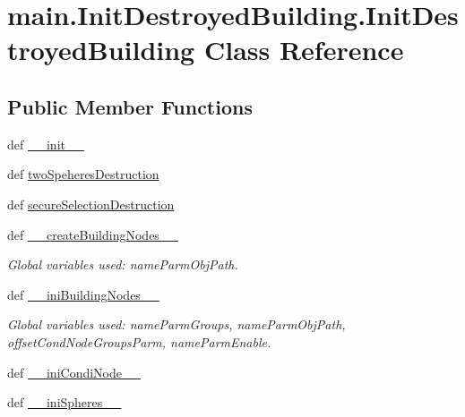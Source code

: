 \hypertarget{classmain_1_1_init_destroyed_building_1_1_init_destroyed_building}{\section{main.\-Init\-Destroyed\-Building.\-Init\-Destroyed\-Building Class Reference}
\label{classmain_1_1_init_destroyed_building_1_1_init_destroyed_building}
}
\subsection*{Public Member Functions}
\begin{DoxyCompactItemize}
\item 
def \hyperlink{classmain_1_1_init_destroyed_building_1_1_init_destroyed_building_a2f4c0cd9f08fdd84a6e25724fa150fb3}{\-\_\-\-\_\-init\-\_\-\-\_\-}
\item 
def \hyperlink{classmain_1_1_init_destroyed_building_1_1_init_destroyed_building_aec0097a736b05efccf95d23d9696a481}{two\-Speheres\-Destruction}
\item 
def \hyperlink{classmain_1_1_init_destroyed_building_1_1_init_destroyed_building_a48a69c6cfa58ff9a02cecf085e74632a}{secure\-Selection\-Destruction}
\item 
def \hyperlink{classmain_1_1_init_destroyed_building_1_1_init_destroyed_building_a1809b73814fbc57e91858e6c389adff6}{\-\_\-\-\_\-create\-Building\-Nodes\-\_\-\-\_\-}
\begin{DoxyCompactList}\small\item\em Global variables used\-: name\-Parm\-Obj\-Path. \end{DoxyCompactList}\item 
def \hyperlink{classmain_1_1_init_destroyed_building_1_1_init_destroyed_building_a6b7faebc62e7207eefe4cd3f77c2a841}{\-\_\-\-\_\-ini\-Building\-Nodes\-\_\-\-\_\-}
\begin{DoxyCompactList}\small\item\em Global variables used\-: name\-Parm\-Groups, name\-Parm\-Obj\-Path, offset\-Cond\-Node\-Groups\-Parm, name\-Parm\-Enable. \end{DoxyCompactList}\item 
def \hyperlink{classmain_1_1_init_destroyed_building_1_1_init_destroyed_building_a29f17dcc9197f7cdb36d50f5e3842464}{\-\_\-\-\_\-ini\-Condi\-Node\-\_\-\-\_\-}
\item 
def \hyperlink{classmain_1_1_init_destroyed_building_1_1_init_destroyed_building_a685297cce27c6927b04cdb9d374aa67f}{\-\_\-\-\_\-ini\-Spheres\-\_\-\-\_\-}

\end{DoxyCompactItemize}
